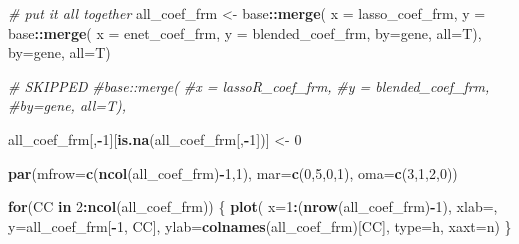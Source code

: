\documentclass[
]{book}
\newenvironment{Shaded}{\begin{snugshade}}{\end{snugshade}}
\newcommand{\CommentTok}[1]{\textcolor[rgb]{0.56,0.35,0.01}{\textit{#1}}}
\newcommand{\ControlFlowTok}[1]{\textcolor[rgb]{0.13,0.29,0.53}{\textbf{#1}}}
\newcommand{\DataTypeTok}[1]{\textcolor[rgb]{0.13,0.29,0.53}{#1}}
\newcommand{\DecValTok}[1]{\textcolor[rgb]{0.00,0.00,0.81}{#1}}
\newcommand{\KeywordTok}[1]{\textcolor[rgb]{0.13,0.29,0.53}{\textbf{#1}}}
\newcommand{\NormalTok}[1]{#1}
\newcommand{\OperatorTok}[1]{\textcolor[rgb]{0.81,0.36,0.00}{\textbf{#1}}}
\newcommand{\StringTok}[1]{\textcolor[rgb]{0.31,0.60,0.02}{#1}}
\begin{document}
\begin{Shaded}
\begin{Highlighting}[]
\CommentTok{\# put it all together}
\NormalTok{all\_coef\_frm <{-}}\StringTok{ }
\StringTok{ }\NormalTok{base}\OperatorTok{::}\KeywordTok{merge}\NormalTok{(}
 \DataTypeTok{x =}\NormalTok{ lasso\_coef\_frm, }
 \DataTypeTok{y =}\NormalTok{ base}\OperatorTok{::}\KeywordTok{merge}\NormalTok{(}
     \DataTypeTok{x =}\NormalTok{ enet\_coef\_frm,}
     \DataTypeTok{y =}\NormalTok{ blended\_coef\_frm,}
         \DataTypeTok{by=}\StringTok{\textquotesingle{}gene\textquotesingle{}}\NormalTok{, }\DataTypeTok{all=}\NormalTok{T),}
 \DataTypeTok{by=}\StringTok{\textquotesingle{}gene\textquotesingle{}}\NormalTok{, }\DataTypeTok{all=}\NormalTok{T)}

\CommentTok{\# SKIPPED}
\CommentTok{\#base::merge(}
         \CommentTok{\#x = lassoR\_coef\_frm,}
         \CommentTok{\#y = blended\_coef\_frm,}
         \CommentTok{\#by=\textquotesingle{}gene\textquotesingle{}, all=T),}

\NormalTok{all\_coef\_frm[,}\OperatorTok{{-}}\DecValTok{1}\NormalTok{][}\KeywordTok{is.na}\NormalTok{(all\_coef\_frm[,}\OperatorTok{{-}}\DecValTok{1}\NormalTok{])] <{-}}\StringTok{ }\DecValTok{0}

\KeywordTok{par}\NormalTok{(}\DataTypeTok{mfrow=}\KeywordTok{c}\NormalTok{(}\KeywordTok{ncol}\NormalTok{(all\_coef\_frm)}\OperatorTok{{-}}\DecValTok{1}\NormalTok{,}\DecValTok{1}\NormalTok{), }\DataTypeTok{mar=}\KeywordTok{c}\NormalTok{(}\DecValTok{0}\NormalTok{,}\DecValTok{5}\NormalTok{,}\DecValTok{0}\NormalTok{,}\DecValTok{1}\NormalTok{), }\DataTypeTok{oma=}\KeywordTok{c}\NormalTok{(}\DecValTok{3}\NormalTok{,}\DecValTok{1}\NormalTok{,}\DecValTok{2}\NormalTok{,}\DecValTok{0}\NormalTok{))}

\ControlFlowTok{for}\NormalTok{(CC }\ControlFlowTok{in} \DecValTok{2}\OperatorTok{:}\KeywordTok{ncol}\NormalTok{(all\_coef\_frm)) \{}
 \KeywordTok{plot}\NormalTok{(}
  \DataTypeTok{x=}\DecValTok{1}\OperatorTok{:}\NormalTok{(}\KeywordTok{nrow}\NormalTok{(all\_coef\_frm)}\OperatorTok{{-}}\DecValTok{1}\NormalTok{), }\DataTypeTok{xlab=}\StringTok{\textquotesingle{}\textquotesingle{}}\NormalTok{, }
  \DataTypeTok{y=}\NormalTok{all\_coef\_frm[}\OperatorTok{{-}}\DecValTok{1}\NormalTok{, CC], }\DataTypeTok{ylab=}\KeywordTok{colnames}\NormalTok{(all\_coef\_frm)[CC],}
  \DataTypeTok{type=}\StringTok{\textquotesingle{}h\textquotesingle{}}\NormalTok{, }\DataTypeTok{xaxt=}\StringTok{\textquotesingle{}n\textquotesingle{}}\NormalTok{)}
\NormalTok{\}}
\end{Highlighting}
\end{Shaded}
\end{document}
